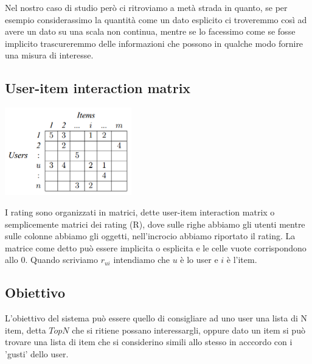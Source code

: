 Nel nostro caso di studio però ci ritroviamo a metà strada in quanto, se per esempio considerassimo la quantità come un dato esplicito ci troveremmo così ad avere un dato su una scala non continua, mentre se lo facessimo come se fosse implicito trascureremmo delle informazioni che possono in qualche modo fornire una misura di interesse.

\subsection{User-item interaction matrix}
\begin{minipage}[H]{0.45\textwidth}
	\begin{center}
		\includegraphics[width=5.5cm]{figures/Sample-of-user-item-matrix}
		\label{tab:user_item_matrix}
	\end{center}
\end{minipage}
\begin{minipage}[H]{0.55\textwidth}
	I rating sono organizzati in matrici, dette user-item interaction matrix o semplicemente matrici dei rating (R), dove sulle righe abbiamo gli utenti mentre sulle colonne abbiamo gli oggetti, nell'incrocio abbiamo riportato il rating. 
	La matrice come detto può essere implicita o esplicita e le celle vuote corrispondono allo 0.
	Quando scriviamo $r_{ui}$ intendiamo che $u$ è lo user e $i$ è l'item.
\end{minipage}

\subsection{Obiettivo}
L'obiettivo del sistema può essere quello di consigliare ad uno user una lista di N item, detta \textbf{$TopN$} che si ritiene possano interessargli, oppure dato un item si può trovare una lista di item che si considerino simili allo stesso in acccordo con i 'gusti' dello user.

